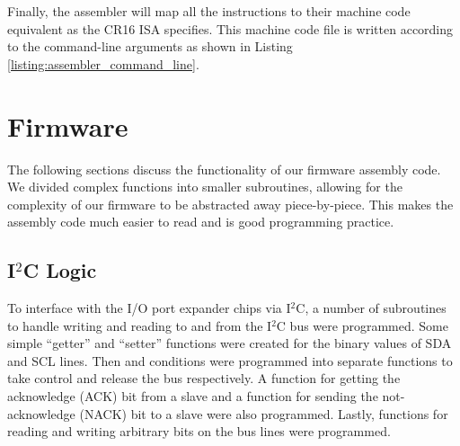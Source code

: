 \documentclass[conference]{IEEEtran}
\begin{document}
Finally, the assembler will map all the instructions to their machine code equivalent as the CR16 ISA specifies. This machine code file is written according to the command-line arguments as shown in Listing \ref{listing:assembler_command_line}.

\section{Firmware}
The following sections discuss the functionality of our firmware assembly code. We divided complex functions into smaller subroutines, allowing for the complexity of our firmware to be abstracted away piece-by-piece. This makes the assembly code much easier to read and is good programming practice.

\subsection{I\hspace{0.25mm}\texorpdfstring{$^{\textit{2}}$} CC Logic}
To interface with the I/O port expander chips via I$^2$C, a number of subroutines to handle writing and reading to and from the I$^2$C bus were programmed. Some simple ``getter'' and ``setter'' functions were created for the binary values of SDA and SCL lines. Then  and  conditions were programmed into separate functions to take control and release the bus respectively. A function for getting the acknowledge (ACK) bit from a slave and a function for sending the not-acknowledge (NACK) bit to a slave were also programmed. Lastly, functions for reading and writing arbitrary bits on the bus lines were programmed.
\end{document}
